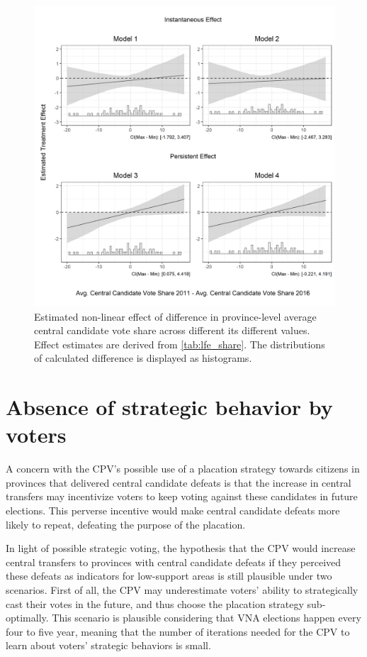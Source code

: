 \documentclass[12pt]{article}
\newcommand{\1}{\mathbbm{1}}
\begin{document}
\begin{figure}[!hbp]
	\centering
	\includegraphics[width=\textwidth]{figure/200218_lfe_share.png}
	\captionsetup{singlelinecheck=off}
	\caption[Effect of difference in central candidate vote share]{Estimated non-linear effect of difference in province-level average central candidate vote share across different its different values. Effect estimates are derived from \autoref{tab:lfe_share}. The distributions of calculated difference is displayed as histograms.}
	\label{fig:lfe_share}
\end{figure}

\section{Absence of strategic behavior by voters}
\label{app:repeat}

A concern with the CPV's possible use of a placation strategy towards citizens in provinces that delivered central candidate defeats is that the increase in central transfers may incentivize voters to keep voting against these candidates in future elections. This perverse incentive would make central candidate defeats more likely to repeat, defeating the purpose of the placation.

In light of possible strategic voting, the hypothesis that the CPV would increase central transfers to provinces with central candidate defeats if they perceived these defeats as indicators for low-support areas is still plausible under two scenarios. First of all, the CPV may underestimate voters' ability to strategically cast their votes in the future, and thus choose the placation strategy sub-optimally. This scenario is plausible considering that VNA elections happen every four to five year, meaning that the number of iterations needed for the CPV to learn about voters' strategic behaviors is small. 
\end{document}
